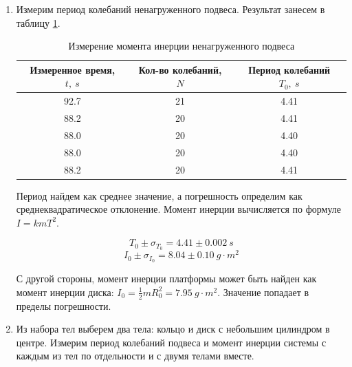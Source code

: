 \documentclass[14pt, a4paper]{article}
\begin{document}
\begin{enumerate}
\item Измерим период колебаний ненагруженного подвеса. Результат занесем в таблицу \ref{table2}.

\begin{table}[h]
\centering
\begin{tabular}{| c | c | c |}
\hline
Измеренное время, $t,\ s$ & Кол-во колебаний, $N$ & Период колебаний $T_0,\ s$\\
\hline
92.7 & 21 & 4.41 \\
88.2 & 20 & 4.41 \\
88.0 & 20 & 4.40 \\
88.0 & 20 & 4.40 \\
88.2 & 20 & 4.41 \\
\hline
\end{tabular}
\label{table2}
\caption{Измерение момента инерции ненагруженного подвеса}
\end{table}

Период найдем как среднее значение, а погрешность определим как среднеквадратическое отклонение. Момент инерции вычисляется по формуле $I=kmT^2$.

\[T_0\pm \sigma_{T_0}=4.41\pm 0.002\ s\]
\[I_0\pm \sigma_{I_0}=8.04\pm 0.10\ g\cdot m^2\]

С другой стороны, момент инерции платформы может быть найден как момент инерции диска: $I_0=\frac{1}{2}mR_0^2=7.95\ g\cdot m^2$. Значение попадает в пределы погрешности.

\item Из набора тел выберем два тела: кольцо и диск с небольшим цилиндром в центре. Измерим период колебаний подвеса  и момент инерции системы с каждым из тел по отдельности и с двумя телами вместе.


\end{enumerate}
\end{document}
